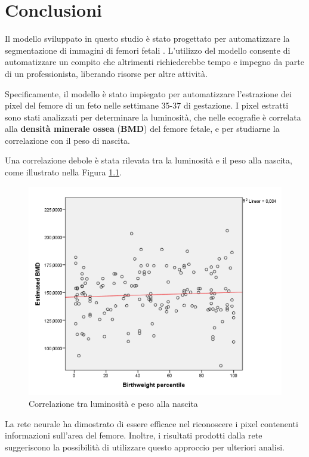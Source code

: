 \chapter{Conclusioni}
\label{chap:Conclusioni}

Il modello sviluppato in questo studio è stato progettato per automatizzare la segmentazione di
immagini di femori fetali \cite{abstract1} \cite{abstract2}. L'utilizzo del modello consente di
automatizzare un compito che altrimenti richiederebbe tempo e impegno da parte di un professionista,
liberando risorse per altre attività.

Specificamente, il modello è stato impiegato per automatizzare l'estrazione dei pixel del femore di
un feto nelle settimane 35-37 di gestazione. I pixel estratti sono stati analizzati per determinare
la luminosità, che nelle ecografie è correlata alla \textbf{densità minerale ossea} (\textbf{BMD})
del femore fetale, e per studiarne la correlazione con il peso di nascita.

Una correlazione debole è stata rilevata tra la luminosità e il peso alla nascita, come illustrato
nella Figura \ref{fig:correlazione tra luminosità e peso alla nascita}.

\begin{figure}[!ht]
    \centering
    \includegraphics[width=0.6\columnwidth]{Immagini/correlation_weight_abstract.png}
    \caption{Correlazione tra luminosità e peso alla nascita}
    \label{fig:correlazione tra luminosità e peso alla nascita}
\end{figure}

La rete neurale ha dimostrato di essere efficace nel riconoscere i pixel contenenti informazioni
sull'area del femore. Inoltre, i risultati prodotti dalla rete suggeriscono la possibilità di
utilizzare questo approccio per ulteriori analisi.
